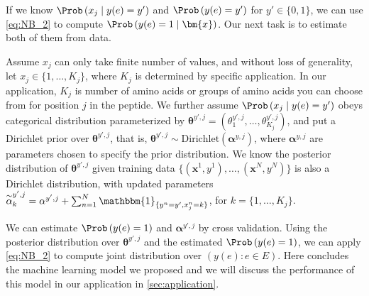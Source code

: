 If we know $\Prob \left( x_j \mid y(e) = y' \right)$ and $\Prob \left( y(e) = y' \right)$ for $y' \in \{0, 1\}$, we can use \eqref{eq:NB_2} to compute $\Prob \left( y(e) = 1 \mid \bm{x} \right)$. Our next task is to estimate both of them from data.

Assume $x_j$ can only take finite number of values, and without loss of generality, let $x_j \in \{1, \ldots, K_j\}$, where $K_j$ is determined by specific application. In our application, $K_j$ is number of amino acids or groups of amino acids you can choose from for position $j$ in the peptide. We further assume $\Prob \left(x_j \mid y(e) = y' \right)$ obeys categorical distribution parameterized by $\bm{\theta}^{y', j} = (\theta^{y', j}_1, \ldots, \theta^{y', j}_{K_j})$, and put a Dirichlet prior over $\bm{\theta}^{y', j}$, that is, $\bm{\theta}^{y', j} \sim \textrm{Dirichlet}(\bm{\alpha}^{y, j})$, where $\bm{\alpha}^{y, j}$ are parameters chosen to specify the prior distribution. We know the posterior distribution of $\bm{\theta}^{y', j}$ given training data $\{(\bm{x}^1, y^1), \ldots, (\bm{x}^N, y^N)\}$ is also a Dirichlet distribution, with updated parameters $\overset{\sim}{\alpha}^{y', j}_k = \alpha^{y', j} + \sum_{n=1}^N \mathbbm{1}_{\{y^n = y', x^n_j = k\}}$, for $k = \{1, \ldots, K_j\}$. 

We can estimate $\Prob \left( y(e)=1 \right)$ and $\bm{\alpha}^{y', j}$ by cross validation. Using the posterior distribution over $\bm{\theta}^{y', j}$ and the estimated $\Prob \left( y(e)=1 \right)$, we can apply \eqref{eq:NB_2} to compute joint distribution over $\left( y(e): e \in E \right)$. Here concludes the machine learning model we proposed and we will discuss the performance of this model in our application in \ref{sec:application}.